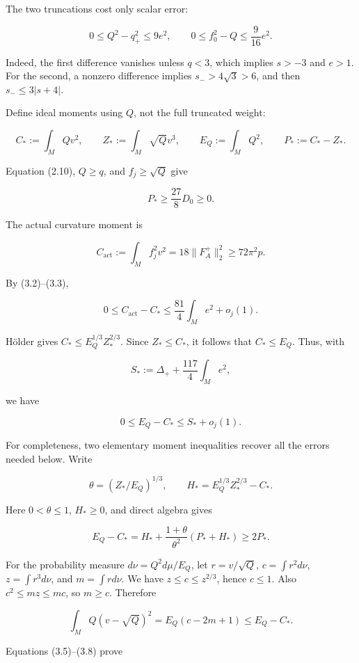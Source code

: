 \documentclass[
  10pt,
]{article}
\begin{document}
The two truncations cost only scalar error:

\[
 0\le Q^2-q_+^2\le9e^2,\qquad
 0\le f_0^2-Q\le\frac9{16}e^2.                          \tag{3.3}
\]

Indeed, the first difference vanishes unless \(q<3\), which implies
\(s>-3\) and \(e>1\). For the second, a nonzero difference implies
\(s_->4\sqrt3>6\), and then \(s_-\le3|s+4|\).

Define ideal moments using \(Q\), not the full truncated weight:

\[
 C_*:=\int_M Qv^2,\qquad Z_*:=\int_M\sqrt Qv^3,
 \qquad E_Q:=\int_M Q^2,\qquad P_*:=C_*-Z_*.
 \tag{3.4}
\]

Equation (2.10), \(Q\ge q\), and \(f_j\ge\sqrt Q\) give

\[
 P_*\ge\frac{27}{8}D_0\ge0.                            \tag{3.5}
\]

The actual curvature moment is

\[
 C_{\mathrm{act}}:=\int_M f_j^2v^2
                      =18\|F_A^+\|_2^2\ge72\pi^2p.
\]

By (3.2)--(3.3),

\[
 0\le C_{\mathrm{act}}-C_*
                     \le\frac{81}{4}\int_M e^2+o_j(1).
\]

Hölder gives \(C_*\le E_Q^{1/3}Z_*^{2/3}\). Since \(Z_*\le C_*\), it
follows that \(C_*\le E_Q\). Thus, with

\[
                        S_*:=\Delta_++\frac{117}{4}\int_Me^2,
\]

we have

\[
                     0\le E_Q-C_*\le S_*+o_j(1).         \tag{3.6}
\]

For completeness, two elementary moment inequalities recover all the
errors needed below. Write

\[
 \theta=(Z_*/E_Q)^{1/3},\qquad
 H_*=E_Q^{1/3}Z_*^{2/3}-C_*.
\]

Here \(0<\theta\le1\), \(H_*\ge0\), and direct algebra gives

\[
 E_Q-C_*=H_*+\frac{1+\theta}{\theta^2}(P_*+H_*)\ge2P_*.
 \tag{3.7}
\]

For the probability measure \(d\nu=Q^2d\mu/E_Q\), let \(r=v/\sqrt Q\),
\(c=\int r^2d\nu\), \(z=\int r^3d\nu\), and \(m=\int rd\nu\). We have
\(z\le c\le z^{2/3}\), hence \(c\le1\). Also \(c^2\le mz\le mc\), so
\(m\ge c\). Therefore

\[
 \int_M Q(v-\sqrt Q)^2=E_Q(c-2m+1)\le E_Q-C_*.
 \tag{3.8}
\]

Equations (3.5)--(3.8) prove
\end{document}
